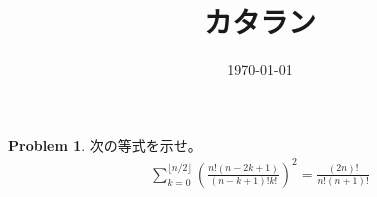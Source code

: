 \documentclass[a4paper,11pt]{jsarticle}
\theoremstyle{plain}
\theoremstyle{definition}
\newtheorem{prob}{Problem}
\renewcommand{\(}{\left(}
\renewcommand{\)}{\right)}
\renewcommand{\[}{\left[}
\renewcommand{\]}{\right]}
\renewcommand{\{}{\left\lbrace}
\renewcommand{\}}{\right\rbrace}
\begin{document}
\title{カタラン}
\author{}
\date{\today}
\maketitle

\begin{prob}
    次の等式を示せ。
    \begin{align*}
        \sum_{k=0}^{\lfloor n/2 \rfloor} \(\frac{n! (n-2k+1)}{(n-k+1)! k!}\)^2 = \frac{(2n)!}{n! (n+1)!}
    \end{align*}    
\end{prob}
\end{document}
